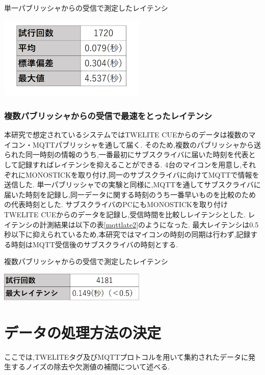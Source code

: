 \clearpage

\begin{table}[htb]
 \centering
  \caption{単一パブリッシャからの受信で測定したレイテンシ}
  \includegraphics[width=7cm, bb= 0 0 1200 600]{chapter3/mqttlate.png}
  \label{mqttlate}
\end{table}

\subsubsection{複数パブリッシャからの受信で最速をとったレイテンシ}
本研究で想定されているシステムではTWELITE CUEからのデータは複数のマイコン・MQTTパブリッシャを通して届く.
そのため,複数のパブリッシャから送られた同一時刻の情報のうち,一番最初にサブスクライバに届いた時刻を代表として記録すればレイテンシを抑えることができる.
4台のマイコンを用意し,それぞれにMONOSTICKを取り付け,同一のサブスクライバに向けてMQTTで情報を送信した.
単一パブリッシャでの実験と同様に,MQTTを通してサブスクライバに届いた時刻を記録し,同一データに関する時刻のうち一番早いものを比較のための代表時刻とした.
サブスクライバのPCにもMONOSTICKを取り付けTWELITE CUEからのデータを記録し,受信時間を比較しレイテンシとした.
レイテンシの計測結果は以下の表\ref{mqttlate2}のようになった.
最大レイテンシは0.5秒以下に抑えられているため,本研究ではマイコンの時刻の同期は行わず,記録する時刻はMQTT受信後のサブスクライバの時刻とする.

\begin{table}[htb]
  \centering
   \caption{複数パブリッシャからの受信で測定したレイテンシ}
   \includegraphics[width=7cm, bb= 0 0 800 250]{chapter3/mqttlate2.png}
   \label{mqttlate2}
\end{table}

\clearpage

\section{データの処理方法の決定}
ここでは,TWELITEタグ及びMQTTプロトコルを用いて集約されたデータに発生するノイズの除去や欠測値の補間について述べる.

